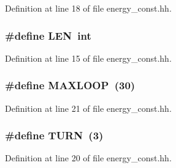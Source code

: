 Definition at line 18 of file energy\+\_\+const.\+hh.

\hypertarget{energy__const_8hh_a05b49c662c073f89e86804f7856622a0}{
\subsubsection[{L\+E\+N}]{\setlength{\rightskip}{0pt plus 5cm}\#define L\+E\+N~int}}\label{energy__const_8hh_a05b49c662c073f89e86804f7856622a0}


Definition at line 15 of file energy\+\_\+const.\+hh.

\hypertarget{energy__const_8hh_ad1bd6eabac419670ddd3c9ed82145988}{
\subsubsection[{M\+A\+X\+L\+O\+O\+P}]{\setlength{\rightskip}{0pt plus 5cm}\#define M\+A\+X\+L\+O\+O\+P~(30)}}\label{energy__const_8hh_ad1bd6eabac419670ddd3c9ed82145988}


Definition at line 21 of file energy\+\_\+const.\+hh.

\hypertarget{energy__const_8hh_ae646250fd59311356c7e5722a81c3a96}{
\subsubsection[{T\+U\+R\+N}]{\setlength{\rightskip}{0pt plus 5cm}\#define T\+U\+R\+N~(3)}}\label{energy__const_8hh_ae646250fd59311356c7e5722a81c3a96}


Definition at line 20 of file energy\+\_\+const.\+hh.

